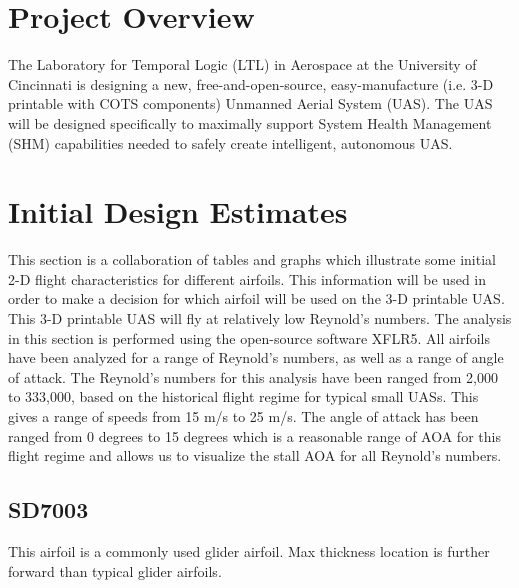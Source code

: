 \documentclass{article}
\begin{document}
\section{Project Overview}
The Laboratory for Temporal Logic (LTL) in Aerospace at the University of Cincinnati is designing a new, free-and-open-source, easy-manufacture (i.e. 3-D printable with COTS components) Unmanned Aerial System (UAS). The UAS will be designed specifically to maximally support System Health Management (SHM) capabilities needed to safely create intelligent, autonomous UAS.

\section{Initial Design Estimates}
This section is a collaboration of tables and graphs which illustrate some initial 2-D flight characteristics for different airfoils.  This information will be used in order to make a decision for which airfoil will be used on the 3-D printable UAS.  This 3-D printable UAS will fly at relatively low Reynold's numbers.  The analysis in this section is performed using the open-source software XFLR5.  All airfoils have been analyzed for a range of Reynold's numbers, as well as a range of angle of attack.  The Reynold's numbers for this analysis have been ranged from 2,000 to 333,000, based on the historical flight regime for typical small UASs.  This gives a range of speeds from 15 m/s to 25 m/s. The angle of attack has been ranged from 0 degrees to 15 degrees which is a reasonable range of AOA for this flight regime and allows us to visualize the stall AOA for all Reynold's numbers.

\subsection{SD7003}
This airfoil is a commonly used glider airfoil. Max thickness location is further forward than typical glider airfoils.
\end{document}
